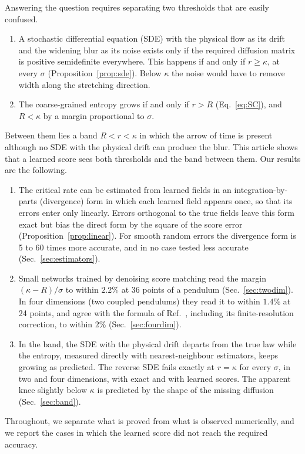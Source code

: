 Answering the question requires separating two thresholds that are easily confused.
\begin{enumerate}
\item[(I)] A stochastic differential equation (SDE) with the physical flow as its drift and the widening blur as its noise exists only if the required diffusion matrix is positive semidefinite everywhere. This happens if and only if $r \geq \kappa$, at every $\sigma$ (Proposition~\ref{prop:sde}). Below $\kappa$ the noise would have to remove width along the stretching direction.
\item[(II)] The coarse-grained entropy grows if and only if $r > R$ (Eq.~\eqref{eq:SC}), and $R < \kappa$ by a margin proportional to $\sigma$.
\end{enumerate}
Between them lies a band $R < r < \kappa$ in which the arrow of time is present although no SDE with the physical drift can produce the blur. This article shows that a learned score sees both thresholds and the band between them. Our results are the following.
\begin{enumerate}
\item The critical rate can be estimated from learned fields in an integration-by-parts (divergence) form in which each learned field appears once, so that its errors enter only linearly. Errors orthogonal to the true fields leave this form exact but bias the direct form by the square of the score error (Proposition~\ref{prop:linear}). For smooth random errors the divergence form is 5 to 60 times more accurate, and in no case tested less accurate (Sec.~\ref{sec:estimators}).
\item Small networks trained by denoising score matching read the margin $(\kappa - R)/\sigma$ to within $2.2\%$ at 36 points of a pendulum (Sec.~\ref{sec:twodim}). In four dimensions (two coupled pendulums) they read it to within $1.4\%$ at 24 points, and agree with the formula of Ref.~\cite{namba2026many}, including its finite-resolution correction, to within $2\%$ (Sec.~\ref{sec:fourdim}).
\item In the band, the SDE with the physical drift departs from the true law while the entropy, measured directly with nearest-neighbour estimators, keeps growing as predicted. The reverse SDE fails exactly at $r = \kappa$ for every $\sigma$, in two and four dimensions, with exact and with learned scores. The apparent knee slightly below $\kappa$ is predicted by the shape of the missing diffusion (Sec.~\ref{sec:band}).
\end{enumerate}
Throughout, we separate what is proved from what is observed numerically, and we report the cases in which the learned score did not reach the required accuracy.
